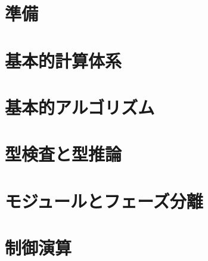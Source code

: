 \documentclass[
  luatex,
  japanese,
  unicode,
  titlepage,
  pdfusetitle
]{ltjsbook}
\begin{document}
\maketitle
\thispagestyle{empty}

\thispagestyle{empty}


\tableofcontents
\clearpage

\chapter{準備}


\chapter{基本的計算体系}










\chapter{基本的アルゴリズム}


\chapter{型検査と型推論}







\chapter{モジュールとフェーズ分離}





\chapter{制御演算}

\end{document}
